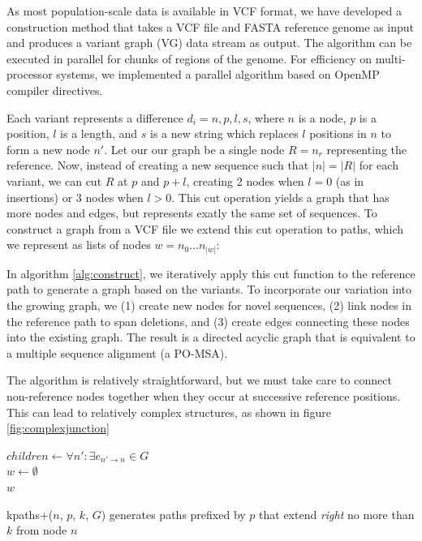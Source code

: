 \documentclass{article}
\begin{document}
As most population-scale data is available in VCF format, we have developed a construction method that takes a VCF file and FASTA reference genome as input and produces a variant graph (VG) data stream as output.
The algorithm can be executed in parallel for chunks of regions of the genome. For efficiency on multi-processor systems, we implemented a parallel algorithm based on OpenMP compiler directives.

Each variant represents a difference $d_i = { n, p, l, s }$, where $n$ is a node, $p$ is a position, $l$ is a length, and $s$ is a new string which replaces $l$ positions in $n$ to form a new node $n'$.
Let our our graph be a single node $R = n_r$ representing the reference.
Now, instead of creating a new sequence such that $|n| = |R|$ for each variant, we can cut $R$ at $p$ and $p+l$, creating 2 nodes when $l = 0$ (as in insertions) or 3 nodes when $l > 0$.
This cut operation yields a graph that has more nodes and edges, but represents exatly the same set of sequences.
To construct a graph from a VCF file we extend this cut operation to paths, which we represent as lists of nodes $w = n_0 \ldots n_{|w|}$:

In algorithm \ref{alg:construct}, we iteratively apply this cut function to the reference path to generate a graph based on the variants. To incorporate our variation into the growing graph, we (1) create new nodes for novel sequences, (2) link nodes in the reference path to span deletions, and (3) create edges connecting these nodes into the existing graph. The result is a directed acyclic graph that is equivalent to a multiple sequence alignment (a PO-MSA).

The algorithm is relatively straightforward, but we must take care to connect non-reference nodes together when they occur at successive reference positions. This can lead to relatively complex structures, as shown in figure \ref{fig:complexjunction}


\begin{function}[h!]
  \label{func:kpaths+}
  $children \gets \forall n' : \exists e_{n' \rightarrow n} \in G$ \\
  $w \gets \emptyset$ \\
  \Return $w$
  \caption{kpaths+($n$, $p$, $k$, $G$) generates paths prefixed by $p$ that extend \emph{right} no more than $k$ from node $n$ }
\end{function}
\end{document}
